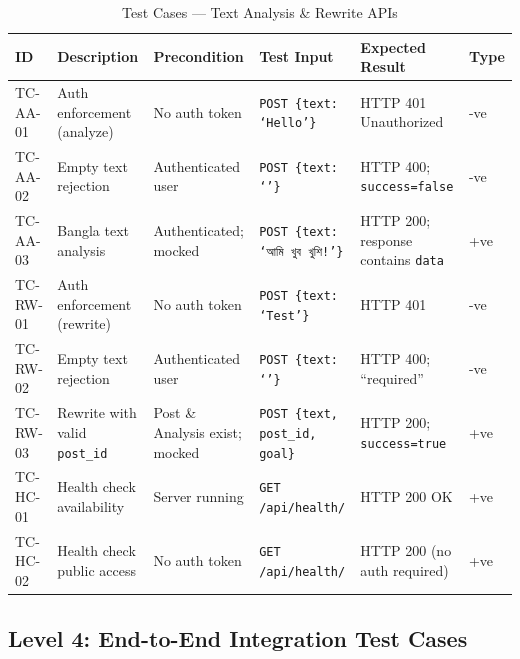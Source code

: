 \documentclass[12pt,a4paper]{report}
\begin{document}
\begin{itemize}
\begin{table}[H]
\raggedright
\caption{Test Cases --- Text Analysis \& Rewrite APIs}
\label{tab:tc_analyze_rewrite}
\footnotesize
\begin{tabularx}{\linewidth}{|p{1.2cm}|p{2.5cm}|p{2.3cm}|p{2.8cm}|X|p{0.7cm}|}
\hline
\textbf{ID} & \textbf{Description} & \textbf{Precondition} & \textbf{Test Input} & \textbf{Expected Result} & \textbf{Type} \\
\hline
TC-AA-01 & Auth enforcement (analyze) & No auth token & \texttt{POST \{text: `Hello'\}} & HTTP 401 Unauthorized & -ve \\
\hline
TC-AA-02 & Empty text rejection & Authenticated user & \texttt{POST \{text: `'\}} & HTTP 400; \texttt{success=false} & -ve \\
\hline
TC-AA-03 & Bangla text analysis & Authenticated; mocked & \texttt{POST \{text: `আমি খুব খুশি!'\}} & HTTP 200; response contains \texttt{data} & +ve \\
\hline
TC-RW-01 & Auth enforcement (rewrite) & No auth token & \texttt{POST \{text: `Test'\}} & HTTP 401 & -ve \\
\hline
TC-RW-02 & Empty text rejection & Authenticated user & \texttt{POST \{text: `'\}} & HTTP 400; ``required'' & -ve \\
\hline
TC-RW-03 & Rewrite with valid \texttt{post\_id} & Post \& Analysis exist; mocked & \texttt{POST \{text, post\_id, goal\}} & HTTP 200; \texttt{success=true} & +ve \\
\hline
TC-HC-01 & Health check availability & Server running & \texttt{GET /api/health/} & HTTP 200 OK & +ve \\
\hline
TC-HC-02 & Health check public access & No auth token & \texttt{GET /api/health/} & HTTP 200 (no auth required) & +ve \\
\hline
\end{tabularx}
\end{table}

\subsection{Level 4: End-to-End Integration Test Cases}


\end{itemize}
\end{document}
